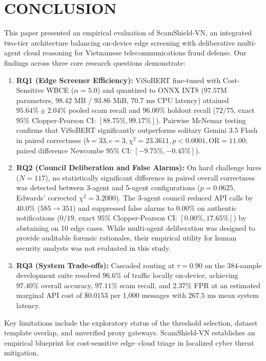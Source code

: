 \documentclass[journal]{IEEEtran}
\begin{document}
\section{CONCLUSION}
\label{sec:conclusion}

This paper presented an empirical evaluation of ScamShield-VN, an integrated two-tier architecture balancing on-device edge screening with deliberative multi-agent cloud reasoning for Vietnamese telecommunications fraud defense. Our findings across three core research questions demonstrate:
\begin{enumerate}
    \item \textbf{RQ1 (Edge Screener Efficiency):} ViSoBERT fine-tuned with Cost-Sensitive WBCE ($\alpha = 5.0$) and quantized to ONNX INT8 ($97.57\text{M}$ parameters, $98.42\text{ MB}$ / $93.86\text{ MiB}$, $70.7\text{ ms}$ CPU latency) attained $95.64\% \pm 2.04\%$ pooled scam recall and $96.00\%$ holdout recall ($72/75$, exact $95\%$ Clopper-Pearson CI: $[88.75\%, 99.17\%]$). Pairwise McNemar testing confirms that ViSoBERT significantly outperforms solitary Gemini 3.5 Flash in paired correctness ($b=33, c=3, \chi^2 = 23.3611, p < 0.0001, \text{OR} = 11.00$; paired difference Newcombe $95\%$ CI: $[-9.75\%, -0.45\%]$).
    \item \textbf{RQ2 (Council Deliberation and False Alarms):} On hard challenge lures ($N=117$), no statistically significant difference in paired overall correctness was detected between 3-agent and 5-agent configurations ($p = 0.0625$, Edwards' corrected $\chi^2 = 3.2000$). The 3-agent council reduced API calls by $40.0\%$ ($585 \to 351$) and suppressed false alarms to $0.00\%$ on authentic notifications ($0/19$, exact $95\%$ Clopper-Pearson CI: $[0.00\%, 17.65\%]$) by abstaining on 10 edge cases. While multi-agent deliberation was designed to provide auditable forensic rationales, their empirical utility for human security analysts was not evaluated in this study.
    \item \textbf{RQ3 (System Trade-offs):} Cascaded routing at $\tau = 0.90$ on the $384$-sample development suite resolved $96.6\%$ of traffic locally on-device, achieving $97.40\%$ overall accuracy, $97.11\%$ scam recall, and $2.37\%$ FPR at an estimated marginal API cost of $\$0.0153$ per 1,000 messages with $267.5\text{ ms}$ mean system latency.
\end{enumerate}

Key limitations include the exploratory status of the threshold selection, dataset template overlap, and unverified proxy gateways. ScamShield-VN establishes an empirical blueprint for cost-sensitive edge--cloud triage in localized cyber threat mitigation.
\end{document}
